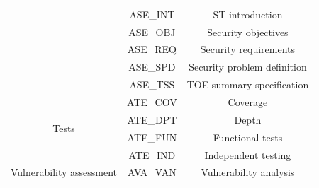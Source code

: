\begin{table}[]
\begin{tabular}{ccc}
                                    & ASE\_INT & ST introduction                       \\
                                    & ASE\_OBJ & Security objectives                   \\
                                    & ASE\_REQ & Security requirements                 \\
                                    & ASE\_SPD & Security problem definition           \\
                                    & ASE\_TSS & TOE summary specification             \\
                                    \midrule
\multirow{4}{*}{Tests}              & ATE\_COV & Coverage                              \\
                                    & ATE\_DPT & Depth                                 \\
                                    & ATE\_FUN & Functional tests                      \\
                                    & ATE\_IND & Independent testing                   \\
                                    \midrule
Vulnerability assessment            & AVA\_VAN & Vulnerability analysis   \\
\bottomrule
            
\end{tabular}
\end{table}



